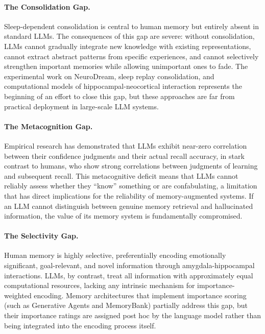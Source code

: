 \paragraph{The Consolidation Gap.} Sleep-dependent consolidation is central to human memory but entirely absent in standard LLMs. The consequences of this gap are severe: without consolidation, LLMs cannot gradually integrate new knowledge with existing representations, cannot extract abstract patterns from specific experiences, and cannot selectively strengthen important memories while allowing unimportant ones to fade. The experimental work on NeuroDream, sleep replay consolidation, and computational models of hippocampal-neocortical interaction represents the beginning of an effort to close this gap, but these approaches are far from practical deployment in large-scale LLM systems.

\paragraph{The Metacognition Gap.} Empirical research has demonstrated that LLMs exhibit near-zero correlation between their confidence judgments and their actual recall accuracy, in stark contrast to humans, who show strong correlations between judgments of learning and subsequent recall. This metacognitive deficit means that LLMs cannot reliably assess whether they ``know'' something or are confabulating, a limitation that has direct implications for the reliability of memory-augmented systems. If an LLM cannot distinguish between genuine memory retrieval and hallucinated information, the value of its memory system is fundamentally compromised.

\paragraph{The Selectivity Gap.} Human memory is highly selective, preferentially encoding emotionally significant, goal-relevant, and novel information through amygdala-hippocampal interactions. LLMs, by contrast, treat all information with approximately equal computational resources, lacking any intrinsic mechanism for importance-weighted encoding. Memory architectures that implement importance scoring (such as Generative Agents and MemoryBank) partially address this gap, but their importance ratings are assigned post hoc by the language model rather than being integrated into the encoding process itself.

